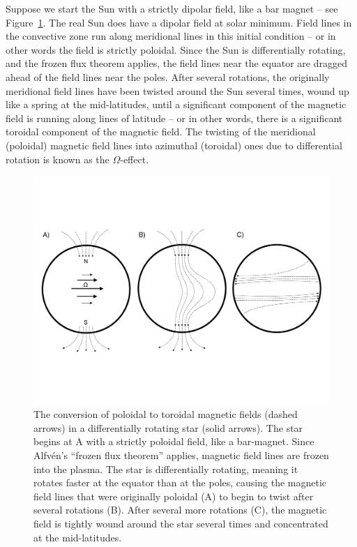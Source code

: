 Suppose we start the Sun with a strictly dipolar field, like a bar magnet -- see Figure~\ref{fig:alpha_omega}. The real Sun does have a dipolar field at solar minimum. Field lines in the convective zone run along meridional lines in this initial condition -- or in other words the field is strictly poloidal. Since the Sun is differentially rotating, and the frozen flux theorem applies, the field lines near the equator are dragged ahead of the field lines near the poles. After several rotations, the originally meridional field lines have been twisted around the Sun several times, wound up like a spring at the mid-latitudes, until a significant component of the magnetic field is running along lines of latitude -- or in other words, there is a significant toroidal component of the magnetic field. The twisting of the meridional (poloidal) magnetic field lines into azimuthal (toroidal) ones due to differential rotation is known as the $\Omega$-effect. 

\begin{figure}
\centering
\includegraphics[scale=0.55]{intro/alpha_omega.pdf}
\caption{The conversion of poloidal to toroidal magnetic fields (dashed arrows) in a differentially rotating star (solid arrows). The star begins at A with a strictly poloidal field, like a bar-magnet. Since Alfv{\'e}n's ``frozen flux theorem''  applies, magnetic field lines are frozen into the plasma. The star is differentially rotating, meaning it rotates faster at the equator than at the poles, causing the magnetic field lines that were originally poloidal (A) to begin to twist after several rotations (B). After several more rotations (C), the magnetic field is tightly wound around the star several times and concentrated at the mid-latitudes. } \label{fig:alpha_omega}
\end{figure}

